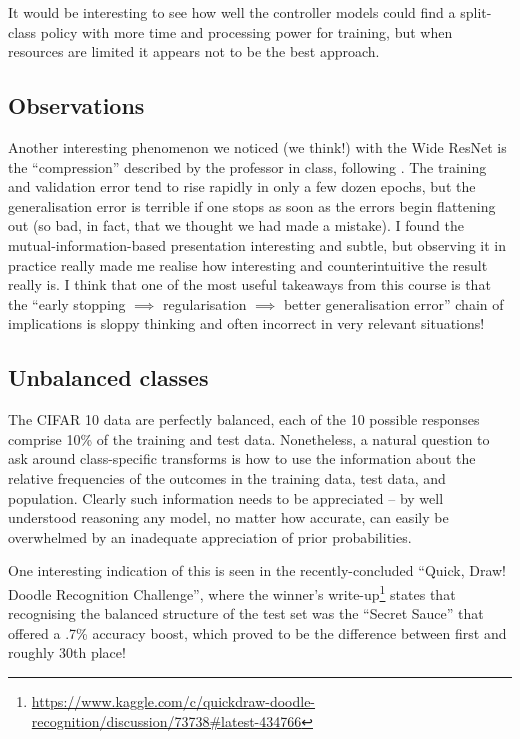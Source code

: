 \documentclass[10pt,twocolumn,letterpaper]{article}
\begin{document}
    It would be interesting to see how well the controller models could find a split-class policy with more time and processing power for training, but when resources are limited it appears not to be the best approach.

  \subsection{Observations}
	
    Another interesting phenomenon we noticed (we think!) with the Wide ResNet is the ``compression'' described by the professor in class, following \cite{Shwartz-Ziv2017}. The training and validation error tend to rise rapidly in only a few dozen epochs, but the generalisation error is terrible if one stops as soon as the errors begin flattening out (so bad, in fact, that we thought we had made a mistake). I found the mutual-information-based presentation interesting and subtle, but observing it in practice really made me realise how interesting and counterintuitive the result really is. I think that one of the most useful takeaways from this course is that the ``early stopping $\implies$ regularisation $\implies$ better generalisation error'' chain of implications is sloppy thinking and often incorrect in very relevant situations!


\subsection{Unbalanced classes}

The CIFAR 10 data are perfectly balanced, each of the 10 possible responses comprise 10\% of the training and test data. Nonetheless, a natural question to ask around class-specific transforms is how to use the information about the relative frequencies of the outcomes in the training data, test data, and population. Clearly such information needs to be appreciated -- by well understood reasoning %
any model, no matter how accurate, can easily be overwhelmed by an inadequate appreciation of prior probabilities. 

One interesting indication of this is seen in the recently-concluded ``Quick, Draw! Doodle Recognition Challenge'', where the winner's write-up\footnote{\url{https://www.kaggle.com/c/quickdraw-doodle-recognition/discussion/73738\#latest-434766}} states that recognising the balanced structure of the test set was the ``Secret Sauce'' that offered a .7\% accuracy boost, which proved to be the difference between first and roughly 30th place!
\end{document}
